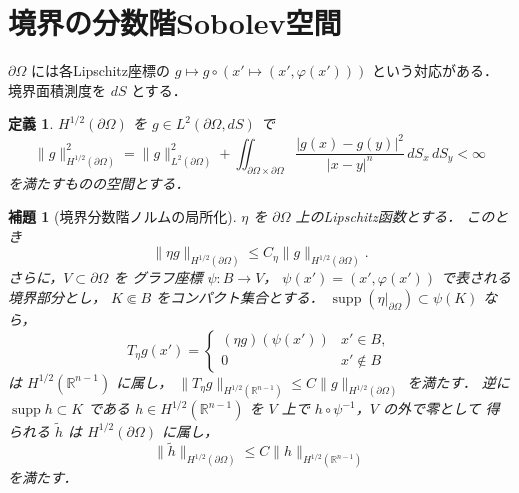 \documentclass[a5paper,10pt,onecolumn]{jsarticle}
\theoremstyle{mathnotetheorem}
\newtheorem{definition}[theorem]{定義}
\newtheorem{lemma}[theorem]{補題}
\newcommand{\norm}[1]{\lVert #1\rVert}
\begin{document}
\section{境界の分数階Sobolev空間}
$\partial\Omega$ には各Lipschitz座標の
$g\mapsto g\circ(x'\mapsto(x',\varphi(x')))$ という対応がある．
境界面積測度を $dS$ とする．

\begin{definition}
$H^{1/2}(\partial\Omega)$ を $g\in L^2(\partial\Omega,dS)$ で
\[
 \norm g_{H^{1/2}(\partial\Omega)}^2
 =\norm g_{L^2(\partial\Omega)}^2
 +\iint_{\partial\Omega\times\partial\Omega}
   \frac{|g(x)-g(y)|^2}{|x-y|^n}\,dS_x\,dS_y<\infty
\]
を満たすものの空間とする．
\end{definition}

\begin{lemma}[境界分数階ノルムの局所化]
\label{lem:boundary-local}
$\eta$ を $\partial\Omega$ 上のLipschitz函数とする．
このとき
\[
 \norm{\eta g}_{H^{1/2}(\partial\Omega)}
 \le C_\eta\norm g_{H^{1/2}(\partial\Omega)}.
\]
さらに，$V\subset\partial\Omega$ を
グラフ座標 $\psi:B\to V$，
$\psi(x')=(x',\varphi(x'))$ で表される境界部分とし，
$K\Subset B$ をコンパクト集合とする．
$\operatorname{supp}(\eta|_{\partial\Omega})\subset\psi(K)$
なら，
\[
 T_\eta g(x')=
 \begin{cases}
  (\eta g)(\psi(x'))&x'\in B,\\
  0&x'\notin B
 \end{cases}
\]
は $H^{1/2}(\mathbb R^{n-1})$ に属し，
$\norm{T_\eta g}_{H^{1/2}(\mathbb R^{n-1})}
 \le C\norm g_{H^{1/2}(\partial\Omega)}$ を満たす．
逆に $\operatorname{supp}h\subset K$ である
$h\in H^{1/2}(\mathbb R^{n-1})$ を
$V$ 上で $h\circ\psi^{-1}$，$V$ の外で零として
得られる $\widetilde h$ は
$H^{1/2}(\partial\Omega)$ に属し，
\[
 \norm{\widetilde h}_{H^{1/2}(\partial\Omega)}
 \le C\norm h_{H^{1/2}(\mathbb R^{n-1})}
\]
を満たす．
\end{lemma}
\end{document}
